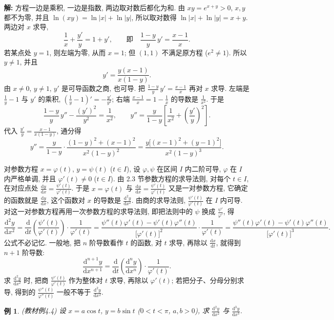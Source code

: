 \documentclass[UTF8,openany]{ctexbook}
\theoremstyle{chinesetextbook}
\newtheorem{example}{例}[section]
\newenvironment{cnsolution}{\par\indent\textbf{解:} \ignorespaces}{\par}
\newcommand{\dd}{\mathrm d}
\begin{document}
\begin{cnsolution}
方程一边是乘积, 一边是指数, 两边取对数后都化为和. 由 $xy=e^{x+y}>0$, $x,y$ 都不为零, 并且 $\ln(xy)=\ln|x|+\ln|y|$, 所以取对数得 $\ln|x|+\ln|y|=x+y$. 两边对 $x$ 求导,
\[
\frac1x+\frac{y'}y=1+y',\qquad\text{即}\quad\frac{1-y}y\,y'=\frac{x-1}x.
\]
若某点处 $y=1$, 则左端为零, 从而 $x=1$; 但 $(1,1)$ 不满足原方程 ($e^2\ne1$). 所以 $y\ne1$, 并且
\[
y'=\frac{y(x-1)}{x(1-y)}.
\]
由 $x\ne0$, $y\ne1$, $y'$ 是可导函数之商, 也可导. 把 $\displaystyle\frac{1-y}y\,y'=\frac{x-1}x$ 再对 $x$ 求导. 左端是 $\displaystyle\frac1y-1$ 与 $y'$ 的乘积, $\displaystyle\left(\frac1y-1\right)'=-\frac{y'}{y^2}$; 右端 $\displaystyle\frac{x-1}x=1-\frac1x$ 的导数是 $\displaystyle\frac1{x^2}$. 于是
\[
\frac{1-y}y\,y''-\frac{(y')^2}{y^2}=\frac1{x^2},\qquad y''=\frac y{1-y}\left[\frac1{x^2}+\left(\frac{y'}y\right)^2\right].
\]
代入 $\displaystyle\frac{y'}y=\frac{x-1}{x(1-y)}$, 通分得
\[
y''=\frac y{1-y}\cdot\frac{(1-y)^2+(x-1)^2}{x^2(1-y)^2}=\frac{y\bigl[(x-1)^2+(y-1)^2\bigr]}{x^2(1-y)^3}.
\]
\end{cnsolution}
对参数方程 $x=\varphi(t)$, $y=\psi(t)$ ($t\in I$), 设 $\varphi,\psi$ 在区间 $I$ 内二阶可导, $\varphi$ 在 $I$ 内严格单调, 并且 $\varphi'(t)\ne0$ ($t\in I$). 由 2.3 节参数方程的求导法则, 对每个 $t\in I$, 在对应点处 $\displaystyle\frac{\dd y}{\dd x}=\frac{\psi'(t)}{\varphi'(t)}$. 于是 $x=\varphi(t)$ 与 $\displaystyle\frac{\dd y}{\dd x}=\frac{\psi'(t)}{\varphi'(t)}$ 又是一对参数方程, 它确定的函数就是 $\displaystyle\frac{\dd y}{\dd x}$, 这个函数对 $x$ 的导数是 $\displaystyle\frac{\dd^2y}{\dd x^2}$. 由商的求导法则, $\displaystyle\frac{\psi'(t)}{\varphi'(t)}$ 在 $I$ 内可导. 对这一对参数方程再用一次参数方程的求导法则, 即把法则中的 $\psi$ 换成 $\displaystyle\frac{\psi'}{\varphi'}$, 得
\[
\frac{\dd^2y}{\dd x^2}=\frac{\dd}{\dd t}\left(\frac{\psi'(t)}{\varphi'(t)}\right)\cdot\frac1{\varphi'(t)}=\frac{\psi''(t)\varphi'(t)-\psi'(t)\varphi''(t)}{\bigl[\varphi'(t)\bigr]^2}\cdot\frac1{\varphi'(t)}=\frac{\psi''(t)\varphi'(t)-\psi'(t)\varphi''(t)}{\bigl[\varphi'(t)\bigr]^3}.
\]
公式不必记忆. 一般地, 把 $n$ 阶导数看作 $t$ 的函数, 对 $t$ 求导, 再除以 $\displaystyle\frac{\dd x}{\dd t}$, 就得到 $n+1$ 阶导数:
\[
\frac{\dd^{n+1}y}{\dd x^{n+1}}=\frac{\dd}{\dd t}\left(\frac{\dd^ny}{\dd x^n}\right)\cdot\frac1{\varphi'(t)}.
\]
求 $\displaystyle\frac{\dd^2y}{\dd x^2}$ 时, 把商 $\displaystyle\frac{\psi'(t)}{\varphi'(t)}$ 作为整体对 $t$ 求导, 再除以 $\varphi'(t)$; 若把分子、分母分别求导, 得到的 $\displaystyle\frac{\psi''(t)}{\varphi''(t)}$ 一般不等于 $\displaystyle\frac{\dd^2y}{\dd x^2}$.
\begin{example}\label{ex:c2-4-4}
\textnormal{(教材例4.4)} 设 $x=a\cos t$, $y=b\sin t$ ($0<t<\pi$, $a,b>0$), 求 $\displaystyle\frac{\dd^2y}{\dd x^2}$ 与 $\displaystyle\frac{\dd^3y}{\dd x^3}$.
\end{example}
\end{document}
